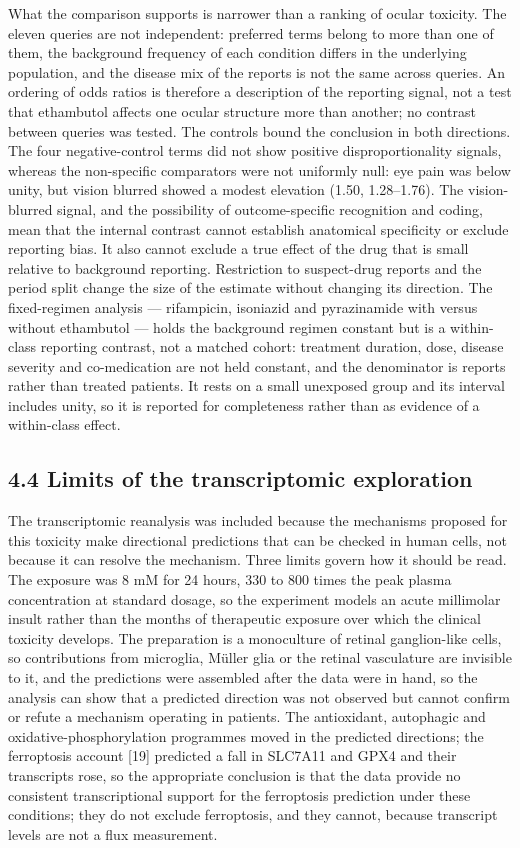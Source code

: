 \documentclass[12pt,a4paper]{article}
\begin{document}
What the comparison supports is narrower than a ranking of ocular toxicity. The eleven queries are not independent: preferred terms belong to more than one of them, the background frequency of each condition differs in the underlying population, and the disease mix of the reports is not the same across queries. An ordering of odds ratios is therefore a description of the reporting signal, not a test that ethambutol affects one ocular structure more than another; no contrast between queries was tested. The controls bound the conclusion in both directions. The four negative-control terms did not show positive disproportionality signals, whereas the non-specific comparators were not uniformly null: eye pain was below unity, but vision blurred showed a modest elevation (1.50, 1.28–1.76). The vision-blurred signal, and the possibility of outcome-specific recognition and coding, mean that the internal contrast cannot establish anatomical specificity or exclude reporting bias. It also cannot exclude a true effect of the drug that is small relative to background reporting. Restriction to suspect-drug reports and the period split change the size of the estimate without changing its direction. The fixed-regimen analysis — rifampicin, isoniazid and pyrazinamide with versus without ethambutol — holds the background regimen constant but is a within-class reporting contrast, not a matched cohort: treatment duration, dose, disease severity and co-medication are not held constant, and the denominator is reports rather than treated patients. It rests on a small unexposed group and its interval includes unity, so it is reported for completeness rather than as evidence of a within-class effect.

\subsection*{4.4 Limits of the transcriptomic exploration}

The transcriptomic reanalysis was included because the mechanisms proposed for this toxicity make directional predictions that can be checked in human cells, not because it can resolve the mechanism. Three limits govern how it should be read. The exposure was 8 mM for 24 hours, 330 to 800 times the peak plasma concentration at standard dosage, so the experiment models an acute millimolar insult rather than the months of therapeutic exposure over which the clinical toxicity develops. The preparation is a monoculture of retinal ganglion-like cells, so contributions from microglia, Müller glia or the retinal vasculature are invisible to it, and the predictions were assembled after the data were in hand, so the analysis can show that a predicted direction was not observed but cannot confirm or refute a mechanism operating in patients. The antioxidant, autophagic and oxidative-phosphorylation programmes moved in the predicted directions; the ferroptosis account [19] predicted a fall in SLC7A11 and GPX4 and their transcripts rose, so the appropriate conclusion is that the data provide no consistent transcriptional support for the ferroptosis prediction under these conditions; they do not exclude ferroptosis, and they cannot, because transcript levels are not a flux measurement.
\end{document}
